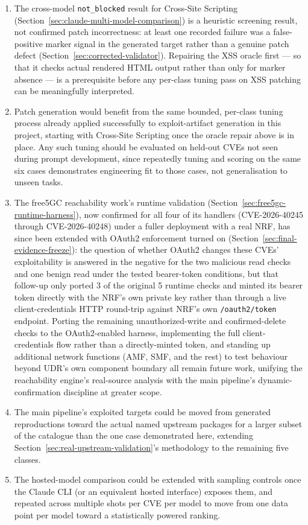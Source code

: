 \documentclass[12pt,a4paper]{report}
\begin{document}
\begin{enumerate}
\item The cross-model \texttt{not\_blocked} result for Cross-Site Scripting (Section~\ref{sec:claude-multi-model-comparison}) is a heuristic screening result, not confirmed patch incorrectness: at least one recorded failure was a false-positive marker signal in the generated target rather than a genuine patch defect (Section~\ref{sec:corrected-validator}). Repairing the XSS oracle first — so that it checks actual rendered HTML output rather than only for marker absence — is a prerequisite before any per-class tuning pass on XSS patching can be meaningfully interpreted.

\item Patch generation would benefit from the same bounded, per-class tuning process already applied successfully to exploit-artifact generation in this project, starting with Cross-Site Scripting once the oracle repair above is in place. Any such tuning should be evaluated on held-out CVEs not seen during prompt development, since repeatedly tuning and scoring on the same six cases demonstrates engineering fit to those cases, not generalisation to unseen tasks.

\item The free5GC reachability work's runtime validation (Section~\ref{sec:free5gc-runtime-harness}), now confirmed for all four of its handlers (CVE-2026-40245 through CVE-2026-40248) under a fuller deployment with a real NRF, has since been extended with OAuth2 enforcement turned on (Section~\ref{sec:final-evidence-freeze}): the question of whether OAuth2 changes these CVEs' exploitability is answered in the negative for the two malicious read checks and one benign read under the tested bearer-token conditions, but that follow-up only ported 3 of the original 5 runtime checks and minted its bearer token directly with the NRF's own private key rather than through a live client-credentials HTTP round-trip against NRF's own \texttt{/oauth2/token} endpoint. Porting the remaining unauthorized-write and confirmed-delete checks to the OAuth2-enabled harness, implementing the full client-credentials flow rather than a directly-minted token, and standing up additional network functions (AMF, SMF, and the rest) to test behaviour beyond UDR's own component boundary all remain future work, unifying the reachability engine's real-source analysis with the main pipeline's dynamic-confirmation discipline at greater scope.

\item The main pipeline's exploited targets could be moved from generated reproductions toward the actual named upstream packages for a larger subset of the catalogue than the one case demonstrated here, extending Section~\ref{sec:real-upstream-validation}'s methodology to the remaining five classes.

\item The hosted-model comparison could be extended with sampling controls once the Claude CLI (or an equivalent hosted interface) exposes them, and repeated across multiple shots per CVE per model to move from one data point per model toward a statistically powered ranking.
\end{enumerate}
\end{document}
